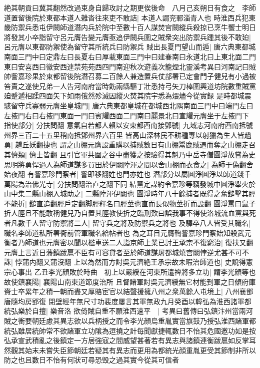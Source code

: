 絶其朝貢曰冀其翻然改過束身自歸攻討之期更俟後命　八月己亥朔日有食之　李師道置留後院於東都本道人雜沓往來吏不敢詰|{
	本道人謂兖鄆淄青人也}
時淮西兵犯東畿防禦兵悉屯伊闕師道潛内兵於院中至數十百人謀焚宫闕縱兵殺掠已烹牛饗士明日將發其小卒詣留守呂元膺告變元膺亟追伊闕兵圍之賊衆突出防禦兵踵其後不敢廹|{
	呂元膺以東都防禦使為留守其所統兵曰防禦兵}
賊出長夏門望山而遁|{
	唐六典東都城南面三門中曰定鼎左曰長夏右曰厚載東面三門中曰建春南曰永道北曰上東北面二門東曰安喜西曰徽安西連禁苑苑西四門南迎秋次遊義次籠煙北靈溪考異曰河南記曰賊帥訾嘉珍果於東都留後院潛召募二百餘人兼造置兵仗部署已定會門子健兒有小過被笞責之遂使兄弟一人告河南府當時飭兩縣驅丁壯悉持弓矢刀棒圍興道坊院數重賊黨廹蹙遞相蹂四面矢下如雨俄然殄滅因縱火焚其院宇悉為煨燼今從實録}
是時都城震駭留守兵寡弱元膺坐皇城門|{
	唐六典東都皇城在都城西北隅南面三門中曰端門左曰左掖門右曰右掖門東面一門曰賓耀西面二門南曰麗景北曰宣耀元膺坐于左掖門下}
指使部分|{
	分扶問翻}
意氣自若都人賴以安東都西南接鄧虢|{
	九域志河南府西南抵虢州界三百二十五里稍南抵鄧州界六百里}
皆高山深林民不耕種專以射獵為生人皆趫勇|{
	趫丘妖翻捷也}
謂之山棚元膺設重購以捕賊數日有山棚鬻鹿賊遇而奪之山棚走召其儕類|{
	儕士皆翻}
且引官軍共圍之谷中盡獲之按驗得其魁乃中岳寺僧圓淨故嘗為史思明將勇悍過人為師道謀多買田於伊闕陸渾之間以舍山棚而衣食之|{
	為師于偽翻舍始夜翻}
有訾嘉珍門察者|{
	訾即移翻姓也門亦姓也}
潛部分以屬圓淨圓淨以師道錢千萬陽為治佛光寺|{
	分扶問翻治直之翻下同}
結黨定謀約令嘉珍等竊發城中圓淨舉火於山中集二縣山棚入城助之|{
	二縣陸渾伊闕也}
圓淨時年八十餘捕者既得之奮鎚擊其脛不能折|{
	鎚直追翻脛戶定翻脚脛釋名曰脛莖也直而長似物莖折而設翻}
圓淨罵曰鼠子折人脛且不能敢稱健兒乃自置其脛教使折之臨刑歎曰誤我事不得使洛城流血黨與死者凡數千人留守防禦將二人|{
	留守兵之將及防禦兵之將也}
及驛卒八人皆受其職名|{
	職名李師道私所署衙前管軍職名給帖者也}
為之耳目元膺鞫訾嘉珍門察始知殺武元衡者乃師道也元膺密以聞以檻車送二人詣京師上業已討王承宗不復窮治|{
	復扶又翻}
元膺上言近日藩鎮跋扈不臣有可容貸者至於師道謀屠都城燒宫闕悖逆尤甚不可不誅|{
	悖蒲内翻又蒲沒翻}
上以為然而方討吳元濟絶王承宗故未暇治師道也|{
	史說得憲宗心事出}
乙丑李光顔敗於時曲　初上以嚴綬在河東所遣禆將多立功|{
	謂李光顔等也}
故使鎮襄陽|{
	襄陽山南東道節度治所}
且督諸軍討吳元濟綬無它材能到軍之日傾府庫賚士卒累年之積一朝而盡又厚賂宦官以結聲援擁八州之衆萬餘人屯境上|{
	八州襄鄧唐隨均房郢復}
閉壁經年無尺寸功裴度屢言其軍無政九月癸酉以韓弘為淮西諸軍都統弘樂於自擅|{
	樂音洛}
欲倚賊自重不願淮西速平　|{
	考異曰舊傳曰弘鎮汴州當兩河賊之衝要朝廷慮其異志欲以兵柄授之而令李光顔烏重胤實當旗鼓乃授弘淮西諸軍都統弘雖居統帥常不欲諸軍立功隂為逗撓之計每聞獻捷輒數日不怡其危國邀功如是按弘承宣武積亂之後鎮定一方居強寇之間威望甚著若有異志與諸鎮連衡跋扈如反掌耳然觀其始末未嘗失臣節朝廷若疑其有異志而更用為都統光顔重胤更受其節制非所以防之也且數日不怡有何狀可尋恐毁之過其實今從其可信者}
